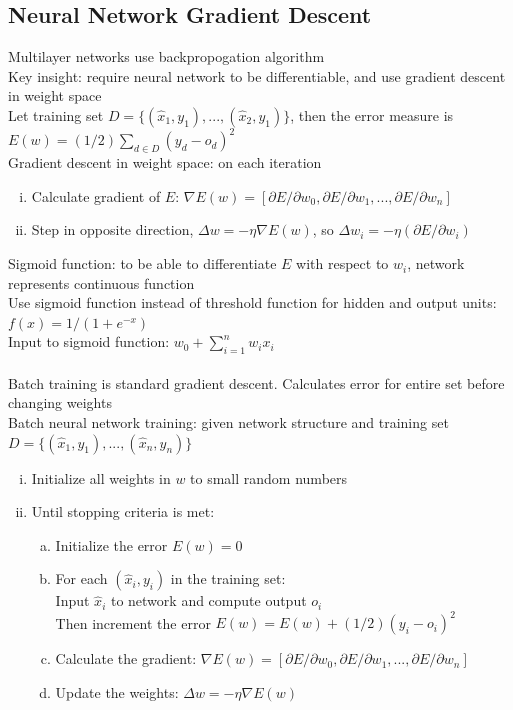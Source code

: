 \documentclass{article}
\begin{document}
		\subsection{Neural Network Gradient Descent}
			Multilayer networks use backpropogation algorithm \\
			Key insight: require neural network to be differentiable, and use gradient descent in weight space \\
			Let training set $D = \{(\hat{x}_1, y_1), ..., (\hat{x}_2, y_1)\}$, then the error measure is $E(w) = (1/2)\sum_{d \in D}(y_d - o_d)^2$ \\
			Gradient descent in weight space: on each iteration
			\begin{enumerate}[(i)]
				\item Calculate gradient of $E$: $\nabla E(w) = [\partial{E}/\partial{w_0}, \partial{E}/\partial{w_1}, ..., \partial{E}/\partial{w_n}]$
				\item Step in opposite direction, $\Delta w = -\eta\nabla E(w)$, so $\Delta w_i = -\eta(\partial{E}/\partial{w_i})$
				\end{enumerate}
			Sigmoid function: to be able to differentiate $E$ with respect to $w_i$, network represents continuous function \\
			Use sigmoid function instead of threshold function for hidden and output units: $f(x) = 1/(1 + e^{-x})$ \\
			Input to sigmoid function: $w_0 + \sum_{i = 1}^n w_ix_i$ \\
			\\
			Batch training is standard gradient descent. Calculates error for entire set before changing weights \\
			Batch neural network training: given network structure and training set $D = \{(\hat{x}_1, y_1), ..., (\hat{x}_n, y_n)\}$
			\begin{enumerate}[(i)]
				\item Initialize all weights in $w$ to small random numbers
				\item Until stopping criteria is met:
				\begin{enumerate}[(a)]
					\item Initialize the error $E(w) = 0$
					\item For each $(\hat{x}_i, y_i)$ in the training set: \\
					Input $\hat{x}_i$ to network and compute output $o_i$ \\
					Then increment the error $E(w) = E(w) + (1/2)(y_i - o_i)^2$
					\item Calculate the gradient: $\nabla E(w) = [\partial{E}/\partial{w_0}, \partial{E}/\partial{w_1}, ..., \partial{E}/\partial{w_n}]$
					\item Update the weights: $\Delta w = -\eta\nabla E(w)$
					\end{enumerate}
				\end{enumerate}
\end{document}
